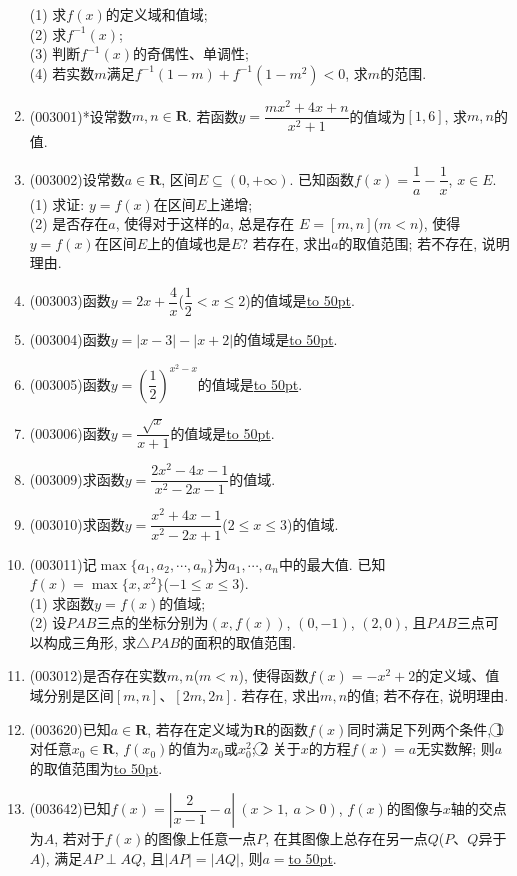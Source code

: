 \documentclass[10pt,a4paper]{article}
\newcommand{\blank}[1]{\underline{\hbox to #1pt{}}}
\begin{document}
\begin{enumerate}[1.]
(1) 求$f(x)$的定义域和值域;\\
(2) 求$f^{-1}(x)$;\\
(3) 判断$f^{-1}(x)$的奇偶性、单调性;\\
(4) 若实数$m$满足$f^{-1}(1-m)+f^{-1}(1-m^2)<0$, 求$m$的范围.
\item {\tiny (003001)}*设常数$m,n\in \mathbf{R}$. 若函数$y=\dfrac{mx^2+4x+n}{x^2+1}$的值域为$[1,6]$, 求$m,n$的值.
\item {\tiny (003002)}设常数$a\in \mathbf{R}$, 区间$E\subseteq (0,+\infty)$. 已知函数$f(x)=\dfrac 1a-\dfrac 1x$, $x\in E$.\\
(1) 求证: $y=f(x)$在区间$E$上递增;\\
(2) 是否存在$a$, 使得对于这样的$a$, 总是存在 $E=[m,n]$($m<n$), 使得$y=f(x)$在区间$E$上的值域也是$E$? 若存在, 求出$a$的取值范围; 若不存在, 说明理由.
\item {\tiny (003003)}函数$y=2x+\dfrac 4x$($\dfrac 12<x\le 2$)的值域是\blank{50}.
\item {\tiny (003004)}函数$y=|x-3|-|x+2|$的值域是\blank{50}.
\item {\tiny (003005)}函数$y=(\dfrac 12)^{x^2-x}$的值域是\blank{50}.
\item {\tiny (003006)}函数$y=\dfrac{\sqrt x}{x+1}$的值域是\blank{50}.
\item {\tiny (003009)}求函数$y=\dfrac{2x^2-4x-1}{x^2-2x-1}$的值域.
\item {\tiny (003010)}求函数$y=\dfrac{x^2+4x-1}{x^2-2x+1}$($2\le x\le 3$)的值域.
\item {\tiny (003011)}记$\max\{a_1,a_2,\cdots,a_n\}$为$a_1,\cdots,a_n$中的最大值. 已知$f(x)=\max\{x,x^2\}$($-1\le x\le 3$).\\
(1) 求函数$y=f(x)$的值域;\\
(2) 设$PAB$三点的坐标分别为$(x,f(x))$, $(0,-1)$, $(2,0)$, 且$PAB$三点可以构成三角形, 求$\triangle PAB$的面积的取值范围.
\item {\tiny (003012)}是否存在实数$m,n$($m<n$), 使得函数$f(x)=-x^2+2$的定义域、值域分别是区间$[m,n]$、$[2m,2n]$. 若存在, 求出$m,n$的值; 若不存在, 说明理由.
\item {\tiny (003620)}已知$a\in \mathbf{R}$, 若存在定义域为$\mathbf{R}$的函数$f(x)$同时满足下列两个条件, \textcircled{1} 对任意$x_0\in \mathbf{R}$, $f(x_0)$的值为$x_0$或$x_0^2$; \textcircled{2} 关于$x$的方程$f(x)=a$无实数解; 则$a$的取值范围为\blank{50}.
\item {\tiny (003642)}已知$f(x)=\left|\dfrac{2}{x-1}-a\right| \ (x>1, \ a>0)$, $f(x)$的图像与$x$轴的交点为$A$, 若对于$f(x)$的图像上任意一点$P$, 在其图像上总存在另一点$Q$($P$、$Q$异于$A$), 满足$AP\perp AQ$, 且$|AP|=|AQ|$, 则$a=$\blank{50}.

\end{enumerate}
\end{document}
